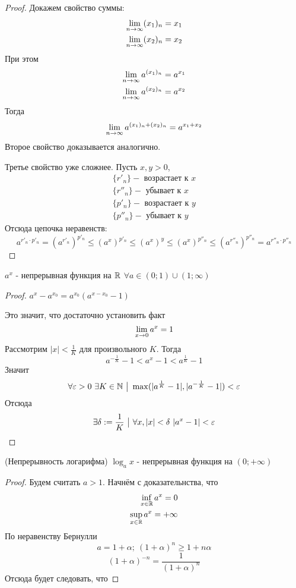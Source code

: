 \begin{proof}
	Докажем свойство суммы:
	\begin{align*}
		\lim\limits_{n \to \infty} (x_1)_n = x_1
		\\
		\lim\limits_{n \to \infty} (x_2)_n = x_2
	\end{align*}
	При этом
	\begin{align*}
		\lim\limits_{n \to \infty} a^{(x_1)_n} = a^{x_1}
		\\
		\lim\limits_{n \to \infty} a^{(x_2)_n} = a^{x_2}
	\end{align*}
	Тогда
	$$
		\lim\limits_{n \to \infty} a^{(x_1)_n + (x_2)_n} = a^{x_1 + x_2}
	$$
	Второе свойство доказывается аналогично.
	
	Третье свойство уже сложнее. Пусть $x, y > 0$,
	\begin{align*}
		\{r'_n\} - \text{ возрастает к } x
		\\
		\{r''_n\} - \text{ убывает к } x
		\\
		\{p'_n\} - \text{ возрастает к } y
		\\
		\{p''_n\} - \text{ убывает к } y
	\end{align*}
	Отсюда цепочка неравенств:
	$$
		a^{r'_n \cdot p'_n} = (a^{r'_n})^{p'_n} \le (a^x)^{p'_n} \le (a^x)^y \le (a^x)^{p''_n} \le (a^{r''_n})^{p''_n} = a^{r''_n \cdot p''_n}
	$$
\end{proof}

\begin{theorem}
	$a^x$ - непрерывная функция на $\mathbb{R}$ $\forall a \in (0; 1) \cup (1; \infty)$
\end{theorem}

\begin{proof}
	$a^x - a^{x_0} = a^{x_0}(a^{x - x_0} - 1)$
	
	Это значит, что достаточно установить факт
	$$
		\lim\limits_{x \to 0} a^x = 1
	$$
	Рассмотрим $|x| < \frac{1}{K}$ для произвольного $K$. Тогда
	$$
		a^{-\frac{1}{K}} - 1 < a^x - 1 < a^{\frac{1}{K}} - 1
	$$
	Значит
	$$
		\forall \varepsilon > 0\ \exists K \in \mathbb{N} \ \big|\  \max(|a^{\frac{1}{K}} - 1|, |a^{-\frac{1}{K}} - 1|) < \varepsilon
	$$
	Отсюда
	$$
		\exists \delta := \frac{1}{K} \ \big|\  \forall x, |x| < \delta\ |a^x - 1| < \varepsilon
	$$
\end{proof}

\begin{corollary} (Непрерывность логарифма)
	$\log_a x$ - непрерывная функция на $(0; +\infty)$
\end{corollary}

\begin{proof}
	Будем считать $a > 1$. Начнём с доказательнства, что
	\begin{align*}
		\inf\limits_{x \in \mathbb{R}} a^x = 0
		\\
		\sup\limits_{x \in \mathbb{R}} a^x = +\infty
	\end{align*}
	По неравенству Бернулли
	$$
		a = 1 + \alpha;\ (1 + \alpha)^n \ge 1 + n\alpha
	$$
	$$
		(1 + \alpha)^{-n} = \frac{1}{(1 + \alpha)^n}
	$$
	Отсюда будет следовать, что 
\end{proof}

